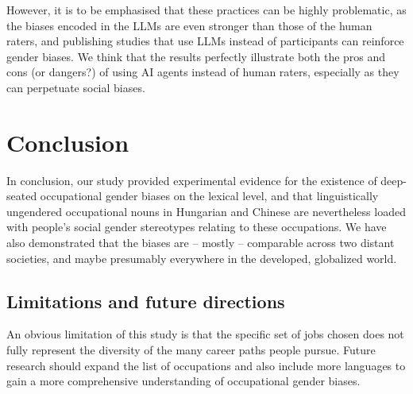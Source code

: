\documentclass[11pt]{article}
\begin{document}
However, it is to be emphasised that these practices can be highly problematic, as the biases encoded in the LLMs are even stronger than those of the human raters, and publishing studies that use LLMs instead of participants can reinforce gender biases. We think that the results perfectly illustrate both the pros and cons (or dangers?) of using AI agents instead of human raters, especially as they can perpetuate social biases.



\section{Conclusion}

In conclusion, our study provided experimental evidence for the existence of deep-seated occupational gender biases on the lexical level, and that linguistically ungendered occupational nouns in Hungarian and Chinese are nevertheless loaded with people's social gender stereotypes relating to these occupations. We have also demonstrated that the biases are -- mostly -- comparable across two distant societies, and maybe presumably everywhere in the developed, globalized world.

\subsection{Limitations and future directions}

An obvious limitation of this study is that the specific set of jobs chosen does not fully represent the diversity of the many career paths people pursue. Future research should expand the list of occupations and also include more languages to gain a more comprehensive understanding of occupational gender biases. 







\end{document}
